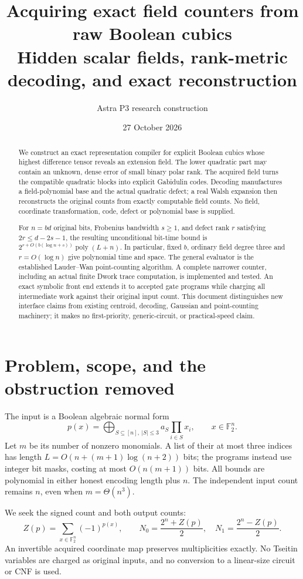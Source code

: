 \documentclass[11pt]{article}
\title{Acquiring exact field counters from raw Boolean cubics\\\large Hidden scalar fields, rank-metric decoding, and exact reconstruction}
\author{Astra P3 research construction}
\date{27 October 2026}
\theoremstyle{remark}\newtheorem{remark}[theorem]{Remark}
\newcommand{\F}{\mathbb F}
\newcommand{\poly}{\operatorname{poly}}
\begin{document}
\maketitle
\begin{abstract}
We construct an exact representation compiler for explicit Boolean cubics whose highest difference tensor reveals an extension field. The lower quadratic part may contain an unknown, dense error of small binary polar rank. The acquired field turns the compatible quadratic blocks into explicit Gabidulin codes. Decoding manufactures a field-polynomial base and the actual quadratic defect; a real Walsh expansion then reconstructs the original counts from exactly computable field counts. No field, coordinate transformation, code, defect or polynomial base is supplied.

For $n=bd$ original bits, Frobenius bandwidth $s\ge1$, and defect rank $r$ satisfying $2r\le d-2s-1$, the resulting unconditional bit-time bound is $2^{r+O(b(\log n+s))}\poly(L+n)$. In particular, fixed $b$, ordinary field degree three and $r=O(\log n)$ give polynomial time and space. The general evaluator is the established Lauder--Wan point-counting algorithm. A complete narrower counter, including an actual finite Dwork trace computation, is implemented and tested. An exact symbolic front end extends it to accepted gate programs while charging all intermediate work against their original input count. This document distinguishes new interface claims from existing centroid, decoding, Gaussian and point-counting machinery; it makes no first-priority, generic-circuit, or practical-speed claim.
\end{abstract}

\section{Problem, scope, and the obstruction removed}
The input is a Boolean algebraic normal form
\[
 p(x)=\bigoplus_{S\subseteq[n],\ |S|\le3} a_S\prod_{i\in S}x_i,
 \qquad x\in\F_2^n.
\]
Let $m$ be its number of nonzero monomials. A list of their at most three indices has length $L=O(n+(m+1)\log(n+2))$ bits; the programs instead use integer bit masks, costing at most $O(n(m+1))$ bits. All bounds are polynomial in either honest encoding length plus $n$. The independent input count remains $n$, even when $m=\Theta(n^3)$.

We seek the signed count and both output counts:
\[
 Z(p)=\sum_{x\in\F_2^n}(-1)^{p(x)},\qquad
 N_0=\frac{2^n+Z(p)}2,\quad N_1=\frac{2^n-Z(p)}2.
\]
An invertible acquired coordinate map preserves multiplicities exactly. No Tseitin variables are charged as original inputs, and no conversion to a linear-size circuit or CNF is used.
\end{document}
